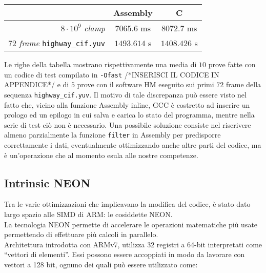 \begin{table}[H]
	\centering
  \begin{tabular}{|r|c|c|}
    \hline
    
    & \textbf{Assembly} & \textbf{C} \\ 
    
    \hline
    \hline
    \hline
    
    $8 \cdot 10^9$ \textit{clamp} & $7065.6$ ms & $8072.7$ ms \\
    
    \hline
    
    $72$ \textit{frame} \verb|highway_cif.yuv| & $1493.614$ s &  $1408.426$ s \\
    
    \hline
  \end{tabular}
\end{table}

Le righe della tabella mostrano rispettivamente una media di $10$ prove fatte 
con un codice di test compilato in \verb|-Ofast| /*INSERISCI IL CODICE IN 
APPENDICE*/ e di $5$ prove con il software HM eseguito sui primi $72$ 
frame della sequenza \verb|highway_cif.yuv|.\newline
Il motivo di tale discrepanza può essere visto nel fatto che, vicino alla 
funzione Assembly inline, GCC è costretto ad inserire un prologo ed un epilogo 
in cui salva e carica lo stato del programma, mentre nella serie di test ciò 
non è necessario.\newline
Una possibile soluzione consiste nel riscrivere almeno parzialmente la funzione 
\verb|filter| in Assembly per predisporre correttamente i dati, eventualmente
ottimizzando anche altre parti del codice, ma è un'operazione che al momento 
esula alle nostre competenze.

\subsection{Intrinsic NEON}

Tra le varie ottimizzazioni che implicavano la modifica del codice, è stato 
dato largo spazio alle SIMD di ARM: le cosiddette NEON.\\
La tecnologia NEON permette di accelerare le operazioni matematiche più usate 
permettendo di effettuare più calcoli in parallelo.\\
Architettura introdotta con ARMv7, utilizza 32 registri a 64-bit interpretati 
come ``vettori di elementi''. Essi possono essere accoppiati in modo da 
lavorare con vettori a 128 bit, ognuno dei quali può essere utilizzato come:

